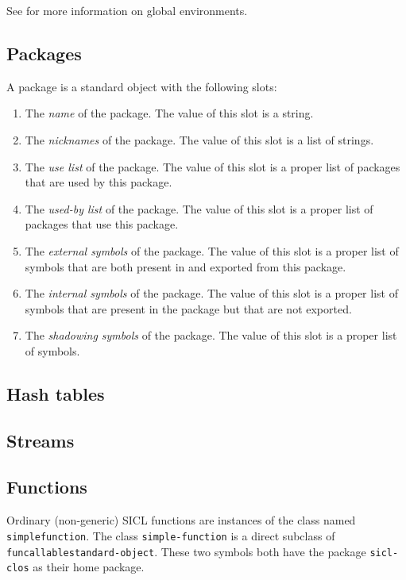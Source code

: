 See  for more information on
global environments.

\subsection{Packages}

A package is a standard object with the following slots:

\begin{enumerate}
\item The \emph{name} of the package.  The value of this slot is a
  string.
\item The \emph{nicknames} of the package.  The value of this slot is
  a list of strings.
\item The \emph{use list} of the package.  The value of this slot is a
  proper list of packages that are used by this package.
\item The \emph{used-by list} of the package.  The value of this slot
is a proper list of packages that use this package.
\item The \emph{external symbols} of the package.  The value of this
  slot is a proper list of symbols that are both present in and
  exported from this package.
\item The \emph{internal symbols} of the package.  The value of this
  slot is a proper list of symbols that are present in the package but
  that are not exported.
\item The \emph{shadowing symbols} of the package.  The value of this
  slot is a proper list of symbols.
\end{enumerate}

\subsection{Hash tables}

\subsection{Streams}

\subsection{Functions}
\label{sec-data-representation-functions}

Ordinary (non-generic) SICL functions are instances of the class named
\texttt{simple\-function}.  The class \texttt{simple-function} is
a direct subclass of \texttt{funcallable\-standard-object}.  These two
symbols both have the package \texttt{sicl-clos} as their home package.

